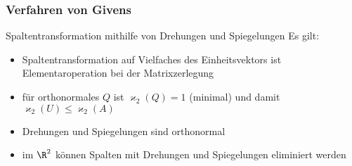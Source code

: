 \subsubsection{Verfahren von Givens}

\begin{defi}{Spaltentransformation mithilfe von Drehungen und Spiegelungen}
    Es gilt:
    \begin{itemize}
        \item Spaltentransformation auf Vielfaches des Einheitsvektors ist Elementaroperation bei der Matrixzerlegung
        \item für orthonormales $Q$ ist $\varkappa_2(Q) = 1$ (minimal) und damit $\varkappa_2(U) \leq \varkappa_2(A)$
        \item Drehungen und Spiegelungen sind orthonormal
        \item im $\R^2$ können Spalten mit Drehungen und Spiegelungen eliminiert werden
    \end{itemize}
\end{defi}

